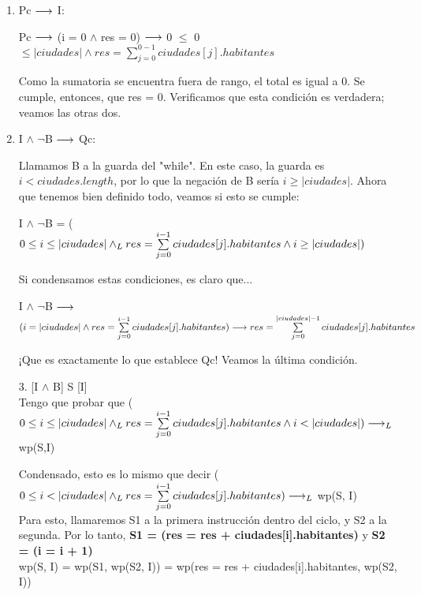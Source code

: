 \documentclass[10pt,a4paper]{article}
\begin{document}
\begin{enumerate} \setlength\itemsep{0cm}
	\item Pc $\longrightarrow$ I:
 
 Pc $\longrightarrow$ (i = 0 $\wedge$ res = 0) $\longrightarrow$ 0 $\leq$ 0 $\leq |ciudades| \wedge  res = \sum\limits_{j=0}^{0 - 1}ciudades[j].habitantes$ 

 Como la sumatoria se encuentra fuera de rango, el total es igual a 0. Se cumple, entonces, que res = 0. Verificamos que esta condición es verdadera; veamos las otras dos.\\

	\item I $\wedge$  $\neg$B $\longrightarrow$ Qc:
 
 Llamamos B a la guarda del "while". En este caso, la guarda es $ i < ciudades.length$, por lo que la negación de B sería $i \geq |ciudades|$. Ahora que tenemos bien definido todo, veamos si esto se cumple:

    I $\wedge$  $\neg$B = ($0 \leq i \leq |ciudades| \land _L res = \sum\limits_{j=0}^{i - 1}ciudades[j].habitantes \wedge i \geq |ciudades|)$

    Si condensamos estas condiciones, es claro que...

    I $\wedge$  $\neg$B $\longrightarrow$$ (i = |ciudades| \wedge res = \sum\limits_{j=0}^{i - 1}ciudades[j].habitantes) \longrightarrow res = \sum\limits_{j=0}^{|ciudades| - 1}ciudades[j].habitantes$

    ¡Que es exactamente lo que establece Qc! Veamos la última condición.\\
    
	\item[3.][I $\wedge$ B] S [I]\\
 Tengo que probar que {($0 \leq i \leq |ciudades| \land _L res = \sum\limits_{j=0}^{i - 1}ciudades[j].habitantes \wedge i < |ciudades|)  \longrightarrow _L$ wp(S,I)}
    
    Condensado, esto es lo mismo que decir ($0 \leq i < |ciudades| \land _L res = \sum\limits_{j=0}^{i - 1}ciudades[j].habitantes) \longrightarrow _L$ wp(S, I)\\
    
    Para esto, llamaremos S1 a la primera instrucción dentro del ciclo, y S2 a la segunda. Por lo tanto, \textbf{S1 = (res = res + ciudades[i].habitantes)} y \textbf{S2 = (i = i + 1)}\\
        
    wp(S, I) = wp(S1, wp(S2, I)) = wp(res = res + ciudades[i].habitantes, wp(S2, I))\\
    

\end{enumerate}
\end{document}
